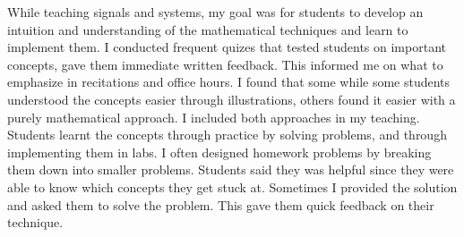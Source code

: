 \documentclass[10pt]{article}
\begin{document}
While teaching signals and systems, %
my goal was for students to develop an intuition and understanding of the mathematical techniques and learn to implement them. %
I conducted frequent quizes that tested students on important concepts, gave them immediate written feedback. This informed me on what to emphasize in recitations and office hours.  %
I found that some while some students understood the concepts easier through illustrations, others found it easier with a purely mathematical approach. I included both approaches in my teaching. %
Students learnt the concepts through practice by solving problems, and through implementing them in labs. %
I often designed homework problems by breaking them down into smaller problems. Students said they was helpful since they were able to know which concepts they get stuck at. Sometimes I provided the solution and asked them to solve the problem. This gave them quick feedback on their technique.
\end{document}

